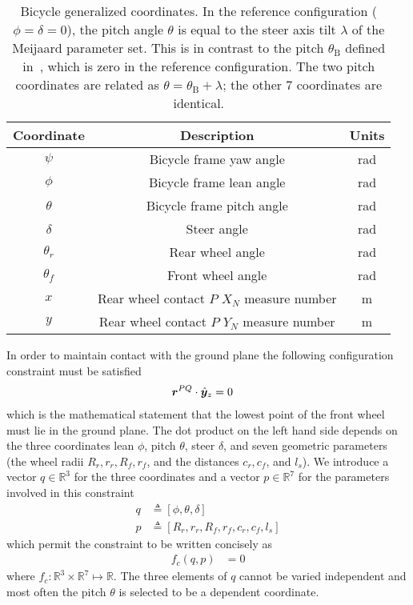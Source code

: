 \begin{table}[htbp]
  \centering
  \begin{tabular}{ccc}
    \toprule
    Coordinate & Description & Units \\
    \midrule
    $\psi$ & Bicycle frame yaw angle & \si{\radian} \\
    $\phi$ & Bicycle frame lean angle & \si{\radian} \\
    $\theta$ & Bicycle frame pitch angle  & \si{\radian} \\
    $\delta$ & Steer angle & \si{\radian} \\
    $\theta_r$ & Rear wheel angle & \si{\radian} \\
    $\theta_f$ & Front wheel angle & \si{\radian} \\
    $x$ & Rear wheel contact $P$ $X_N$ measure number & \si{\m} \\
    $y$ & Rear wheel contact $P$ $Y_N$ measure number & \si{\m} \\
    \bottomrule
  \end{tabular}
  \caption[Bicycle generalized coordinates.]{Bicycle generalized coordinates.
    In the reference configuration ($\phi= \delta=0$), the pitch angle $\theta$
    is equal to the steer axis tilt $\lambda$ of the Meijaard parameter set.
    This is in contrast to the pitch $\theta_{\text{B}}$ defined
    in~\cite{Meijaard2007}, which is zero in the reference configuration. The
    two pitch coordinates are related as $\theta = \theta_{\text{B}} +
    \lambda$; the other 7 coordinates are identical.}
  \label{model:tab:coordinates}
\end{table}

In order to maintain contact with the ground plane the following configuration
constraint must be satisfied
\begin{align}
  \boldsymbol{r}^{PQ} \cdot \hat{\boldsymbol{y}}_{z} &= 0
\end{align}
which is the mathematical statement that the lowest point of the front wheel
must lie in the ground plane. The dot product on the left hand side depends on
the three coordinates lean $\phi$, pitch $\theta$, steer $\delta$, and seven
geometric parameters (the wheel radii $R_r, r_r, R_f, r_f$, and the distances
$c_r, c_f$, and $l_s$). We introduce a vector $q\in\mathbb{R}^3$ for the three
coordinates and a vector $p\in\mathbb{R}^7$ for the parameters involved in this
constraint
\begin{align}
  q &\triangleq \left[\phi, \theta, \delta\right]\label{model:q_min}\\
  p &\triangleq \left[R_r, r_r, R_f, r_f, c_r, c_f, l_s\right]
  \label{model:constraint_parameters}
\end{align}
which permit the constraint to be written concisely as
\begin{align}
  f_c(q, p) &= 0
  \label{model:f_c}
\end{align}
where $f_c : \mathbb{R}^3 \times \mathbb{R}^7 \mapsto \mathbb{R}$.  The three
elements of $q$ cannot be varied independent and most often the pitch $\theta$
is selected to be a dependent coordinate.

